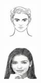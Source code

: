 \documentclass{IEEEcsmag}
\begin{document}
\begin{figure}[ht]
\begin{subfigure}{0.12\textwidth}
    \end{subfigure}
    \begin{subfigure}{0.12\textwidth}
        \includegraphics[width=\linewidth]{Digital sketches/draws_resized/image11.jpeg}
    \end{subfigure}
    \begin{subfigure}{0.12\textwidth}
        \includegraphics[width=\linewidth]{Random sketch/draws_resized/image2.jpeg}

\end{subfigure}
\end{figure}
\end{document}
